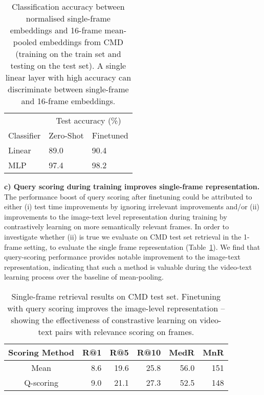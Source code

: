 \begin{table}[t]
\centering
\setlength{\tabcolsep}{14pt}
\caption{Classification accuracy between normalised single-frame embeddings and 16-frame mean-pooled embeddings from CMD (training on the train set and testing on the test set). A single linear layer with high accuracy can discriminate between single-frame and 16-frame embeddings.}
\scriptsize
\begin{tabular}{@{}lll@{}}
\toprule
\textbf{}  & \multicolumn{2}{c}{Test accuracy (\%)} \\ \cmidrule(l){2-3} 
Classifier & Zero-Shot         & Finetuned        \\ \midrule
Linear     & 89.0                   & 90.4               \\
MLP        & 97.4              & 98.2               \\ \bottomrule
\end{tabular}
\label{tab:vmean_class}
\end{table} 


\noindent\textbf{c) Query scoring during training improves single-frame representation.} The performance boost of query scoring after finetuning could be attributed to either (i) test time improvements by ignoring irrelevant improvements and/or (ii) improvements to the image-text level representation during training by contrastively learning on more semantically relevant frames. In order to investigate whether (ii) is true we evaluate on CMD test set retrieval in the 1-frame setting, to evaluate the single frame representation (Table~\ref{tab:vmean_class}). We find that query-scoring performance provides notable improvement to the image-text representation, indicating that such a method is valuable during the video-text learning process over the baseline of mean-pooling.
\begin{table}
\centering
\scriptsize
\setlength{\tabcolsep}{8pt}
\vspace{-0.5em}
\caption{Single-frame retrieval results on CMD test set. Finetuning with query scoring improves the image-level representation -- showing the effectiveness of constrastive learning on video-text pairs with relevance scoring on frames.}
\begin{tabular}{@{}crrrrr@{}}
\toprule
\textbf{Scoring Method} & \textbf{R@1}  & \textbf{R@5}  & \textbf{R@10} & \textbf{MedR} & \textbf{MnR} \\ \midrule
Mean  & 8.6          & 19.6       & 25.8        & 56.0  & 151 \\
Q-scoring & 9.0        & 21.1        & 27.3          & 52.5 &  148\\ \bottomrule
\end{tabular}
\vspace{-0.5em}
\label{tab:single-frame}
\end{table} 

